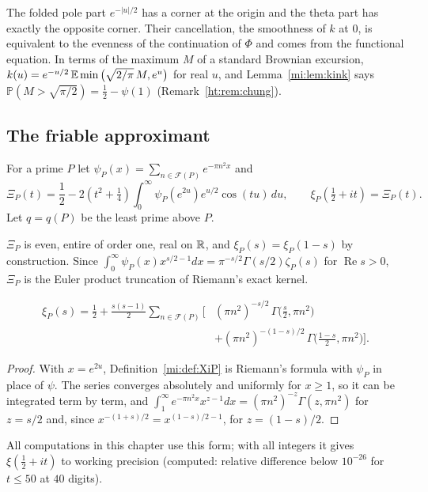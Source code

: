 The folded pole part $e^{-|u|/2}$ has a corner at the origin and the theta part has exactly the opposite corner. Their cancellation, the smoothness of $k$ at $0$, is equivalent to the evenness of the continuation of $\Phi$ and comes from the functional equation. In terms of the maximum $M$ of a standard Brownian excursion, $k(u)=e^{-u/2}\,\mathbb{E}\min\big(\sqrt{2/\pi}\,M,e^u\big)$ for real $u$, and Lemma~\ref{mi:lem:kink} says $\mathbb P(M>\sqrt{\pi/2})=\tfrac12-\psi(1)$ (Remark~\ref{ht:rem:chung}).

\subsection{The friable approximant}\label{mi:sec:def}

\begin{definition}\label{mi:def:XiP}
For a prime $P$ let $\psi_P(x)=\sum_{n\in\mathcal F(P)}e^{-\pi n^2x}$ and
\[
\Xi_P(t)=\frac12-2\left(t^2+\tfrac14\right)\int_0^\infty\psi_P(e^{2u})e^{u/2}\cos(tu)\,du,\qquad\xi_P(\tfrac12+it)=\Xi_P(t).
\]
Let $q=q(P)$ be the least prime above $P$.
\end{definition}

$\Xi_P$ is even, entire of order one, real on $\mathbb{R}$, and $\xi_P(s)=\xi_P(1-s)$ by construction. Since $\int_0^\infty\psi_P(x)x^{s/2-1}dx=\pi^{-s/2}\Gamma(s/2)\zeta_P(s)$ for $\operatorname{Re}s>0$, $\Xi_P$ is the Euler product truncation of Riemann's exact kernel.

\begin{proposition}\label{mi:prop:incgamma}
\begin{align*}
\xi_P(s)=\frac12+\frac{s(s-1)}2\sum_{n\in\mathcal F(P)}\Big[&(\pi n^2)^{-s/2}\,\Gamma\big(\tfrac s2,\pi n^2\big)\\
&+(\pi n^2)^{-(1-s)/2}\,\Gamma\big(\tfrac{1-s}2,\pi n^2\big)\Big].
\end{align*}
\end{proposition}

\begin{proof}
With $x=e^{2u}$, Definition~\ref{mi:def:XiP} is Riemann's formula with $\psi_P$ in place of $\psi$. The series converges absolutely and uniformly for $x\ge1$, so it can be integrated term by term, and $\int_1^\infty e^{-\pi n^2x}x^{z-1}dx=(\pi n^2)^{-z}\Gamma(z,\pi n^2)$ for $z=s/2$ and, since $x^{-(1+s)/2}=x^{(1-s)/2-1}$, for $z=(1-s)/2$.
\end{proof}

All computations in this chapter use this form; with all integers it gives $\xi(\tfrac12+it)$ to working precision (computed: relative difference below $10^{-26}$ for $t\le50$ at $40$ digits).

